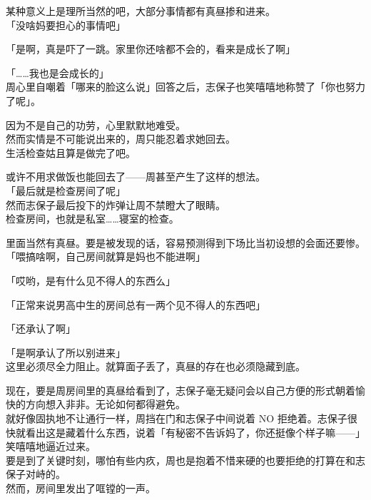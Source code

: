 某种意义上是理所当然的吧，大部分事情都有真昼掺和进来。\\

「没啥妈要担心的事情吧」

「是啊，真是吓了一跳。家里你还啥都不会的，看来是成长了啊」

「……我也是会成长的」\\

周心里自嘲着「哪来的脸这么说」回答之后，志保子也笑嘻嘻地称赞了「你也努力了呢」。

因为不是自己的功劳，心里默默地难受。\\

然而实情是不可能说出来的，周只能忍着求她回去。\\

生活检查姑且算是做完了吧。

或许不用求做饭也能回去了——周甚至产生了这样的想法。\\

「最后就是检查房间了呢」\\

然而志保子最后投下的炸弹让周不禁瞪大了眼睛。\\

检查房间，也就是私室……寝室的检查。

里面当然有真昼。要是被发现的话，容易预测得到下场比当初设想的会面还要惨。\\

「喂搞啥啊，自己房间就算是妈也不能进啊」

「哎哟，是有什么见不得人的东西么」

「正常来说男高中生的房间总有一两个见不得人的东西吧」

「还承认了啊」

「是啊承认了所以别进来」\\

这里必须尽全力阻止。就算面子丢了，真昼的存在也必须隐藏到底。

现在，要是周房间里的真昼给看到了，志保子毫无疑问会以自己方便的形式朝着愉快的方向想入非非。无论如何都得避免。\\

就好像固执地不让通行一样，周挡在门和志保子中间说着 NO 拒绝着。志保子很快就看出这是藏着什么东西，说着「有秘密不告诉妈了，你还挺像个样子嘛——」笑嘻嘻地逼近过来。\\

要是到了关键时刻，哪怕有些内疚，周也是抱着不惜来硬的也要拒绝的打算在和志保子对峙的。\\

然而，房间里发出了哐镗的一声。\\

